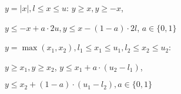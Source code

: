 \documentclass[11pt,landscape,a4paper,fleqn]{article}
\begin{document}
\begin{multicols*}{4}
$y = |x|, l \leq x \leq u$: $y \geq x, y \geq -x$,

$y \leq -x + a \cdot 2u, y \leq x - (1-a) \cdot 2l$, $a \in \{0,1\}$

$y = \max(x_1, x_2), l_1 \leq x_1 \leq u_1, l_2 \leq x_2 \leq u_2$:

$y \geq x_1, y \geq x_2$, $y \leq x_1 + a \cdot (u_2 - l_1)$,

$y \leq x_2 + (1 - a) \cdot (u_1 - l_2), a \in \{0,1\}$











\end{multicols*}
\end{document}
